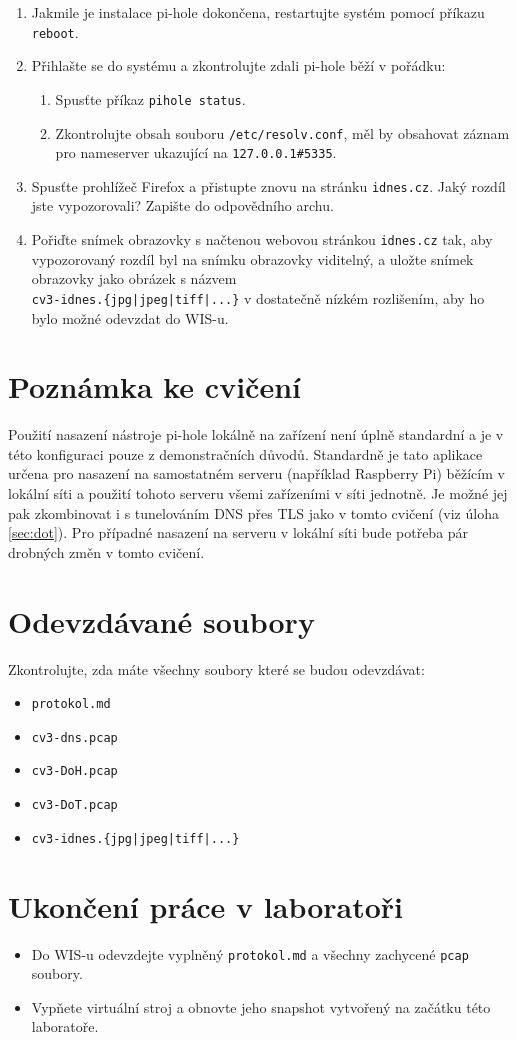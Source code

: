 \begin{enumerate}
\begin{enumerate}
    \end{enumerate}
    \item Jakmile je instalace pi-hole dokončena, restartujte systém pomocí příkazu \texttt{reboot}.
    \item Přihlašte se do systému a zkontrolujte zdali pi-hole běží v pořádku:
    \begin{enumerate}
        \item Spusťte příkaz \texttt{pihole status}.
        \item Zkontrolujte obsah souboru \texttt{/etc/resolv.conf}, měl by obsahovat záznam pro nameserver ukazující na \texttt{127.0.0.1\#5335}.
    \end{enumerate}
    \item Spusťte prohlížeč Firefox a přistupte znovu na stránku \texttt{idnes.cz}. Jaký rozdíl jste vypozorovali? Zapište do odpovědního archu.
	\item Pořiďte snímek obrazovky s načtenou webovou stránkou \texttt{idnes.cz} tak, aby vypozorovaný rozdíl byl na snímku obrazovky viditelný, a uložte snímek obrazovky jako obrázek s názvem\\ \texttt{cv3-idnes.\{jpg|jpeg|tiff|...\}} v dostatečně nízkém rozlišením, aby ho bylo možné odevzdat do WIS-u.
\end{enumerate}

\section*{Poznámka ke cvičení}
Použití nasazení nástroje pi-hole lokálně na zařízení není úplně standardní a je v této konfiguraci pouze z demonstračních důvodů. Standardně je tato aplikace určena pro nasazení na samostatném serveru (například Raspberry Pi) běžícím v lokální síti a použití tohoto serveru všemi zařízeními v síti jednotně. Je možné jej pak zkombinovat i s tunelováním DNS přes TLS jako v tomto cvičení (viz úloha \ref{sec:dot}). Pro případné nasazení na serveru v lokální síti bude potřeba pár drobných změn v tomto cvičení.

\section*{Odevzdávané soubory}
Zkontrolujte, zda máte všechny soubory které se budou odevzdávat:
\begin{itemize}
  \item \texttt{protokol.md}
  \item \texttt{cv3-dns.pcap}
  \item \texttt{cv3-DoH.pcap}
  \item \texttt{cv3-DoT.pcap}
  \item \texttt{cv3-idnes.\{jpg|jpeg|tiff|...\}}
\end{itemize}

\section*{Ukončení práce v laboratoři}
\begin{itemize}
	\item Do WIS-u odevzdejte vyplněný \texttt{protokol.md} a všechny zachycené \texttt{pcap} soubory.
	\item Vypňete virtuální stroj a obnovte jeho snapshot vytvořený na začátku této laboratoře.
\end{itemize}
